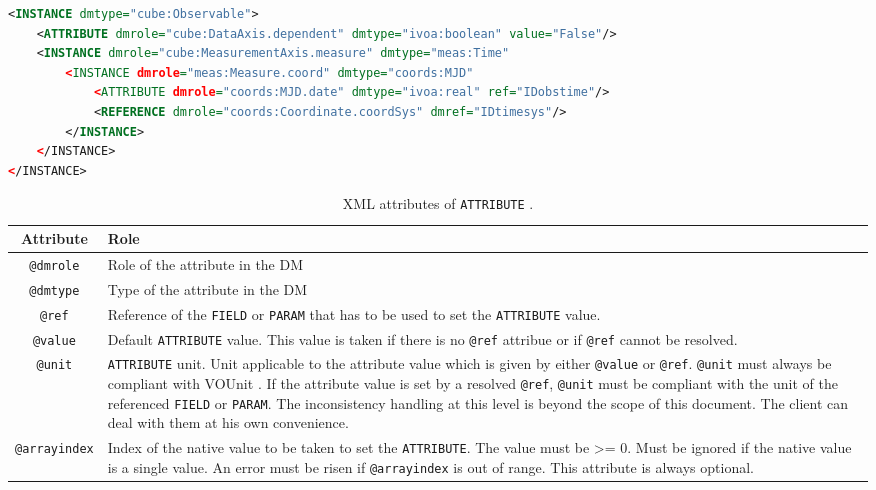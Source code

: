 \begin{lstlisting}[caption={Example of an \texttt{ATTRIBUTE} set with either a column reference or a static value (see \ref{ATTRIBUTE_snippet}). If the column reference cannot be resolved, the attribute will be set with its static value.},language=XML]
<INSTANCE dmtype="cube:Observable">
    <ATTRIBUTE dmrole="cube:DataAxis.dependent" dmtype="ivoa:boolean" value="False"/>
    <INSTANCE dmrole="cube:MeasurementAxis.measure" dmtype="meas:Time"
        <INSTANCE dmrole="meas:Measure.coord" dmtype="coords:MJD"
            <ATTRIBUTE dmrole="coords:MJD.date" dmtype="ivoa:real" ref="IDobstime"/>
            <REFERENCE dmrole="coords:Coordinate.coordSys" dmref="IDtimesys"/>
        </INSTANCE>
    </INSTANCE>
</INSTANCE>
\end{lstlisting}  


\begin{table}[!htbp]
\small
\centering
\begin{tabulary}{\linewidth}{|c|J|}       
       \hline 
            \textbf{Attribute} & 
            \textbf {Role}\\
       \hline         \hline  
            \texttt{@dmrole} & 
            Role of the attribute in the DM\\
        \hline 
            \texttt{@dmtype} & 
            Type of the attribute in the DM\\
        \hline 
            \texttt{@ref} & 
            Reference of the \texttt{FIELD} or \texttt{PARAM} that has to be used to set the 
            \texttt{ATTRIBUTE} value.\\
        \hline 
            \texttt{@value}  &
            Default \texttt{ATTRIBUTE} value. This value is taken if there is no 
            \texttt{@ref} attribue or if \texttt{@ref} cannot be resolved.\\
        \hline 
            \texttt{@unit} & 
            \texttt{ATTRIBUTE} unit. Unit applicable to the attribute value which is given 
            by either \texttt{@value} or \texttt{@ref}. \texttt{@unit} must always 
            be compliant with VOUnit \citep{2014ivoa.spec.0523D}. 
            If the attribute value is set by a resolved \texttt{@ref}, 
            \texttt{@unit} must be compliant with the unit of the referenced
            \texttt{FIELD} or \texttt{PARAM}. The inconsistency handling at 
            this level is beyond the scope of this document. The client can 
            deal with them at his own convenience.\\
        \hline 
            \texttt{@arrayindex} & 
            Index of the native value to be taken to set the \texttt{ATTRIBUTE}. 
            The value must be >= 0.
            Must be ignored if the native value is a single value. 
            An error must be risen if \texttt{@arrayindex} is out of range.
            This attribute is always optional.\\
        \hline 
     \end{tabulary}
     \caption{XML attributes of  \texttt{ATTRIBUTE} .} 
     \label{tbl:attribute-att}
 \end{table}

